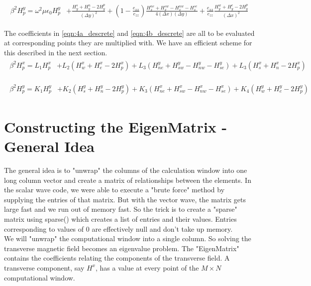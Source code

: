 \documentclass[letter]{article}
\begin{document}
	\begin{align}
	\begin{split}
		\beta^2 H^y_p = \omega^2 \mu \epsilon_0 H^y_p &+ \frac{H_y^s + H_y^n - 2H_y^p}{(\Delta y)^2}  + (1 - \frac{e_{xx}}{e_{zz}}) \frac{H_x^{ne} + H_x^{sw} - H_x^{nw} - H_x^{se}}{4(\Delta x)(\Delta y)} + \frac{e_{xx}}{e_{zz}} \frac{H_y^w + H_y^e - 2H_y^p}{(\Delta x)^2} 
		\label{eqn:4b_descrete}
	\end{split}
	\end{align}
	
	The coefficients in \ref{eqn:4a_descrete} and \ref{eqn:4b_descrete} are all to be evaluated at corresponding points they are multiplied with. We have an efficient scheme for this described in the next section.\\
	
	\begin{align}
	\begin{split}
		\beta^2 H^x_p = L_1 H^x_p &+ L_2(H^x_w + H^x_e - 2H^x_p) + L_3 (H^y_{ne} + H^y_{sw} - H^y_{nw} - H^y_{se}) + L_3 (H^x_s + H^x_n - 2H^x_p) 
		\label{eqn:4a_descrete*}		
		\end{split}
	\end{align}
	
	\begin{align}
	\begin{split}
		\beta^2 H^y_p = K_1 H^y_p &+ K_2(H^y_s + H^y_n - 2H^y_p)  + K_3(H^x_{ne} + H^x_{sw} - H^x_{nw} - H^x_{se})+ K_4(H^y_w + H^y_e - 2H^y_p) 
		\label{eqn:4b_descrete*}
	\end{split}
	\end{align}
	
	\section*{Constructing the EigenMatrix - General Idea}
		
		\indent The general idea is to "unwrap" the columns of the calculation window into one long column vector and create a matrix of relationships between the elements. In the scalar wave code, we were able to execute a "brute force" method by supplying the entries of that matrix. But with the vector wave, the matrix gets large fast and we run out of memory fast. So the trick is to create a "sparse" matrix using sparse() which creates a list of entries and their values. Entries corresponding to values of 0 are effectively null and don't take up memory. \\
		\indent We will "unwrap" the computational window into a single column. So solving the transverse magnetic field becomes an eigenvalue problem. The "EigenMatrix" contains the coefficients relating the components of the transverse field. A transverse component, say $H^x$, has a value at every point of the $M \times N$ computational window. \\
		
\end{document}
